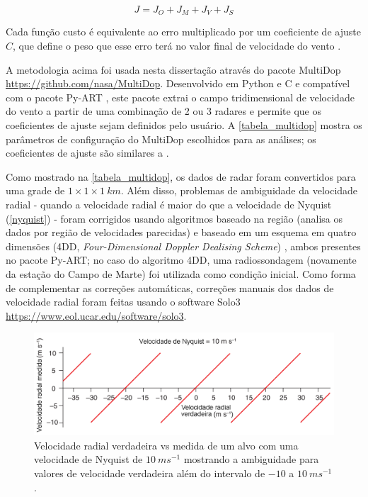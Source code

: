 \begin{equation}
J=J_O+J_M+J_V+J_S
\end{equation}

Cada função custo é equivalente ao erro multiplicado por um coeficiente de ajuste $C$, que define o peso que esse erro terá no valor final de velocidade do vento \cite{Potvin2012b}.

A metodologia acima foi usada nesta dissertação através do pacote MultiDop \url{https://github.com/nasa/MultiDop}. Desenvolvido em Python e C e compatível com o pacote Py-ART \cite{Helmus2016}, este pacote extrai o campo tridimensional de velocidade do vento a partir de uma combinação de 2 ou 3 radares e permite que os coeficientes de ajuste sejam definidos pelo usuário. A \autoref{tabela_multidop} mostra os parâmetros de configuração do MultiDop escolhidos para as análises; os coeficientes de ajuste são similares a .



Como mostrado na \autoref{tabela_multidop}, os dados de radar foram convertidos para uma grade de $1 \times 1 \times 1\:km$. Além disso, problemas de ambiguidade da velocidade radial - quando a velocidade radial é maior do que a velocidade de Nyquist (\autoref{nyquist}) - foram corrigidos usando algoritmos baseado na região (analisa os dados por região de velocidades parecidas) e baseado em um esquema em quatro dimensões (4DD, \textit{Four-Dimensional Doppler Dealising Scheme}) \cite{James2001}, ambos presentes no pacote Py-ART; no caso do algoritmo 4DD, uma radiossondagem (novamente da estação do Campo de Marte) foi utilizada como condição inicial. Como forma de complementar as correções automáticas, correções manuais dos dados de velocidade radial foram feitas usando o software Solo3 \url{https://www.eol.ucar.edu/software/solo3}.

\begin{figure}[htb]
	\begin{center}
		\caption{Velocidade radial verdadeira vs medida de um alvo com uma velocidade de Nyquist de $10\:ms^{-1}$ mostrando a ambiguidade para valores de velocidade verdadeira além do intervalo de $-10$ a $10\:ms^{-1}$.} 
		\label{nyquist}
		\includegraphics[width=\columnwidth]{figs/nyquist_rauber_ptbr.png}
	\end{center}
\end{figure}

